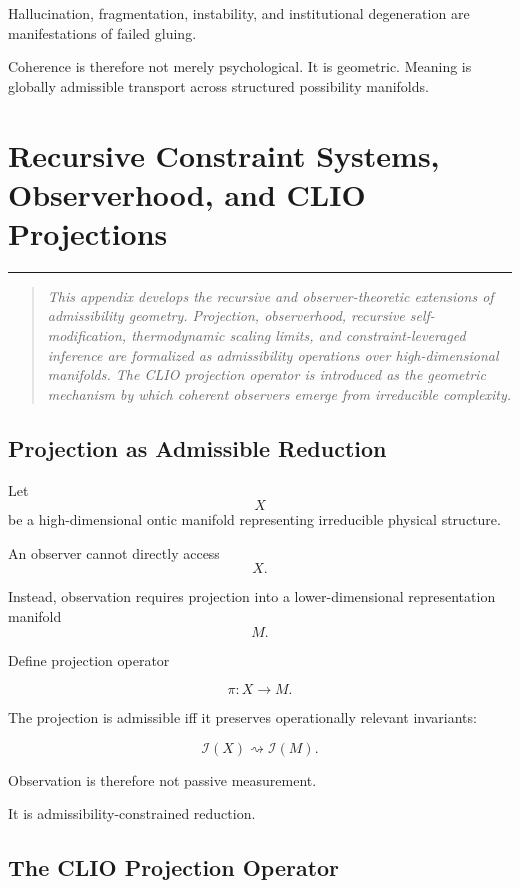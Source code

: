 \documentclass[12pt,openany]{book}
\theoremstyle{plain}
\theoremstyle{definition}
\theoremstyle{remark}
\newcommand{\chapterrule}{%
  \vspace{4pt}%
  {\color{SpherepopBlue}\rule{\textwidth}{0.8pt}}%
  \vspace{10pt}%
}
\newenvironment{chapterprecis}{%
  \begin{quote}\small\itshape}{%
  \end{quote}\medskip}
\begin{document}
Hallucination, fragmentation, instability, and institutional
degeneration are manifestations of failed gluing.

Coherence is therefore not merely psychological. It is geometric. Meaning is globally admissible transport across structured possibility manifolds.


\chapter{Recursive Constraint Systems, Observerhood, and CLIO Projections}
\chapterrule

\begin{chapterprecis}
This appendix develops the recursive and observer-theoretic
extensions of admissibility geometry. Projection, observerhood,
recursive self-modification, thermodynamic scaling limits, and
constraint-leveraged inference are formalized as admissibility
operations over high-dimensional manifolds. The CLIO projection
operator is introduced as the geometric mechanism by which
coherent observers emerge from irreducible complexity.
\end{chapterprecis}

\section{Projection as Admissible Reduction}

Let
\[
X
\]
be a high-dimensional ontic manifold representing irreducible
physical structure.

An observer cannot directly access
\[
X.
\]

Instead, observation requires projection into a lower-dimensional
representation manifold
\[
M.
\]

Define projection operator

\[
\pi :
X \to M.
\]

The projection is admissible iff it preserves operationally
relevant invariants:

\[
\mathcal{I}(X)
\rightsquigarrow
\mathcal{I}(M).
\]

Observation is therefore not passive measurement.

It is admissibility-constrained reduction.

\section{The CLIO Projection Operator}
\end{document}
